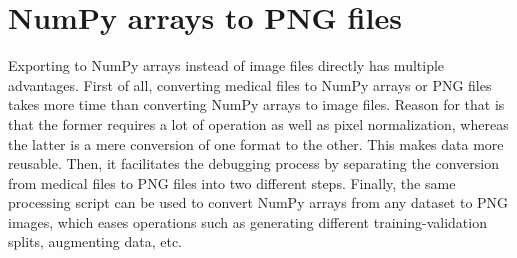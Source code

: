 \section{NumPy arrays to PNG files}
Exporting to NumPy arrays instead of image files directly has multiple advantages. First of all, converting medical files to NumPy arrays or PNG files takes more time than converting NumPy arrays to image files. Reason for that is that the former requires a lot of operation as well as pixel normalization, whereas the latter is a mere conversion of one format to the other. This makes data more reusable. Then, it facilitates the debugging process by separating the conversion from medical files to PNG files into two different steps. Finally, the same processing script can be used to convert NumPy arrays from any dataset to PNG images, which eases operations such as generating different training-validation splits, augmenting data, etc.

